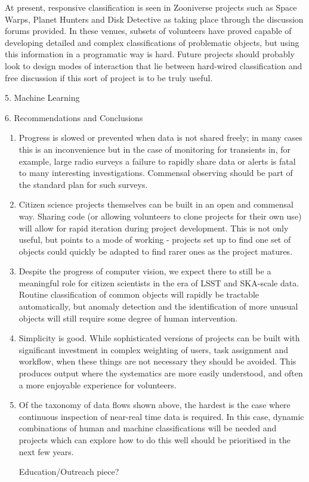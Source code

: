 At present, responsive classification is seen in Zooniverse projects such as Space Warps, Planet Hunters and Disk Detective as taking place through the discussion forums provided. In these venues, subsets of volunteers have proved capable of developing detailed and complex classifications of problematic objects, but using this information in a programatic way is hard. Future projects should probably look to design modes of interaction that lie between hard-wired classification and free discussion if this sort of project is to be truly useful. 


5. Machine Learning

6. Recommendations and Conclusions

\begin{enumerate}

\item Progress is slowed or prevented when data is not shared freely; in many cases this is an inconvenience but in the case of monitoring for transients in, for example, large radio surveys a failure to rapidly share data or alerts is fatal to many interesting investigations. Commensal observing should be part of the standard plan for such surveys.

\item Citizen science projects themselves can be built in an open and commensal way. Sharing code (or allowing volunteers to clone projects for their own use) will allow for rapid iteration during project development. This is not only useful, but points to a mode of working - projects set up to find one set of objects could quickly be adapted to find rarer ones as the project matures. 

\item Despite the progress of computer vision, we expect there to still be a meaningful role for citizen scientists in the era of LSST and SKA-scale data. Routine classification of common objects will rapidly be tractable automatically, but anomaly detection and the identification of more unusual objects will still require some degree of human intervention. 

\item Simplicity is good. While sophisticated versions of projects can be built with significant investment in complex weighting of users, task assignment and workflow, when these things are not necessary they should be avoided. This produces output where the systematics are more easily understood, and often a more enjoyable experience for volunteers. 

\item Of the taxonomy of data flows shown above, the hardest is the case where continuous inspection of near-real time data is required. In this case, dynamic combinations of human and machine classifications will be needed and projects which can explore how to do this well should be prioritised in the next few years.

\item [Education/Outreach piece?]

\end{enumerate}